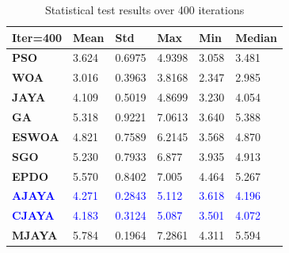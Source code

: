 \documentclass[3p,twocolumn]{elsarticle}
\theoremstyle{thmstyleone}%
\theoremstyle{thmstyletwo}%
\theoremstyle{thmstylethree}%
\begin{document}
\begin{table}[]
	\caption{Statistical test results over 400 iterations}
	\label{testcase3}
	\centering
	\begin{tabular}{@{}llllll@{}}
		\toprule
		\textbf{Iter=400} & \textbf{Mean} & \textbf{Std} & \textbf{Max} & \textbf{Min} & \textbf{Median} \\ \midrule
		\textbf{PSO}      & 3.624      & 0.6975     & 4.9398     & 3.058     & 3.481        \\
		\textbf{WOA}      & 3.016      & 0.3963     & 3.8168     & 2.347     & 2.985        \\
		\textbf{JAYA}     & 4.109      & 0.5019     & 4.8699      & 3.230     & 4.054        \\
		\textbf{GA}       & 5.318      & 0.9221     & 7.0613      & 3.640     & 5.388        \\
		\textbf{ESWOA}    & 4.821      & 0.7589     & 6.2145     & 3.568      & 4.870        \\
        \textbf{SGO}    & 5.230      & 0.7933     & 6.877     & 3.935      & 4.913        \\
        \textbf{EPDO}    & 5.570      & 0.8402     & 7.005     & 4.464      & 5.267        \\
        \textcolor{blue}{\textbf{AJAYA}} & \textcolor{blue}{4.271} & \textcolor{blue}{0.2843} & \textcolor{blue}{5.112} & \textcolor{blue}{3.618} & \textcolor{blue}{4.196} \\
        \textcolor{blue}{\textbf{CJAYA}} & \textcolor{blue}{4.183} & \textcolor{blue}{0.3124} & \textcolor{blue}{5.087} & \textcolor{blue}{3.501} & \textcolor{blue}{4.072} \\
		\textbf{MJAYA}    & 5.784      & 0.1964     & 7.2861     & 4.311     & 5.594        \\ \bottomrule
	\end{tabular}
\end{table}
\end{document}
